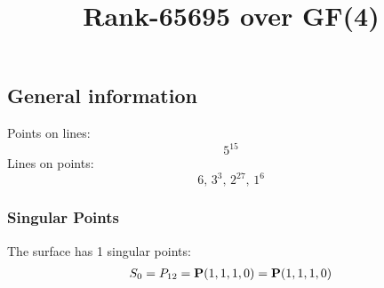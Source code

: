 \documentclass{article}
\newcommand\setTBstruts{\def\T{\rule{0pt}{2.6ex}}%
\def\B{\rule[-1.2ex]{0pt}{0pt}}}
\newcommand{\bP}{{\bf P}}
\begin{document}
 
\setTBstruts



{\allowdisplaybreaks%






\title{Rank-65695 over GF(4)}
\author{}%
\maketitle%
%
{}



\subsection*{General information}
Points on lines:
$$
5^{15}$$
Lines on points:
$$
6,\,3^3,\,2^{27},\,1^6$$
\subsubsection*{Singular Points}
The surface has 1 singular points:\\
\begin{align*}
S_{0} &= P_{12}=\bP(1, 1, 1, 0) = \bP(1, 1, 1, 0)\\
\end{align*}
}
\end{document}
